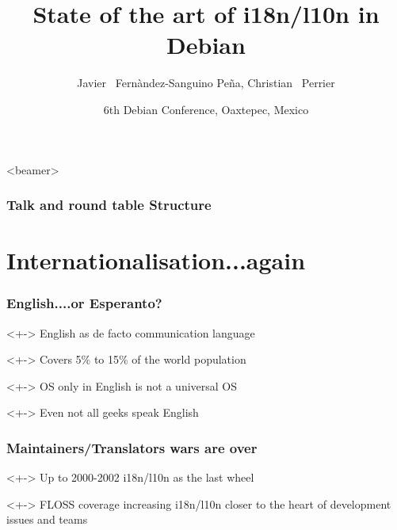 \documentclass{beamer}
\title[State of the art of i18n/l10n in Debian] 
{State of the art of i18n/l10n in Debian}
\author[jfs, bubulle] 
{Javier ~Fernàndez-Sanguino Peña, Christian ~Perrier}
\date[Debconf 6] 
{6th Debian Conference, Oaxtepec, Mexico}
\begin{document}
\frame{\titlepage}

\begin{frame}<beamer>
    \frametitle{Talk and round table Structure}
    \tableofcontents[subsectionstyle=hide]
\end{frame}

\section{Internationalisation...again}


\begin{frame}
  \frametitle{English....or Esperanto?}
	\begin{block}<+->
		{English as de facto communication language}
	\end{block}
	\begin{block}<+->
		{Covers 5\% to 15\% of the world population}
	\end{block}
	\begin{block}<+->
		{OS only in English is not a universal OS}
	\end{block}
	\begin{block}<+->
		{Even not all geeks speak English}
	\end{block}
\end{frame}

\begin{frame}
  \frametitle{Maintainers/Translators wars are over}
	\begin{block}<+->
		{Up to 2000-2002}
		i18n/l10n as the last wheel
	\end{block}
	\begin{block}<+->
		{FLOSS coverage increasing}
		i18n/l10n closer to the heart of development issues and teams
	\end{block}
\end{frame}
\end{document}
